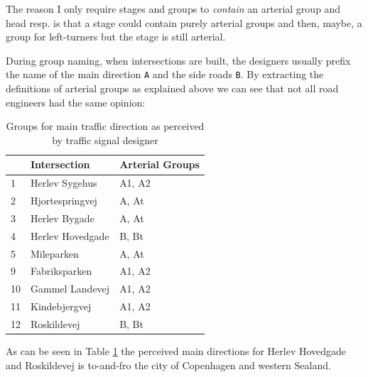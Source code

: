 The reason I only require stages and groups to \textit{contain} an arterial group and head resp. is that a stage could contain purely arterial groups and then, maybe, a group for left-turners but the stage is still arterial.

During group naming, when intersections are built, the designers usually prefix the name of the main direction \verb|A| and the side roads \verb|B|. By extracting the definitions of arterial groups as explained above we can see that not all road engineers had the same opinion:

\begin{table}[!ht]
\begin{center}
\begin{tabular}{l|l|l}
 & \textbf{Intersection} & \textbf{Arterial Groups}\\ \hline
1 & Herlev Sygehus & A1, A2\\
2 & Hjortespringvej & A, At\\
3 & Herlev Bygade & A, At\\
4 & Herlev Hovedgade & B, Bt\\
5 & Mileparken & A, At\\
9 & Fabriksparken & A1, A2\\
10 & Gammel Landevej & A1, A2\\
11 & Kindebjergvej & A1, A2\\
12 & Roskildevej & B, Bt\\
\end{tabular}
\end{center}
\caption{Groups for main traffic direction as perceived by traffic signal designer}
\label{tab:arterial_groups}
\end{table}

As can be seen in Table \ref{tab:arterial_groups} the perceived main directions for Herlev Hovedgade and Roskildevej is to-and-fro the city of Copenhagen and western Sealand.
